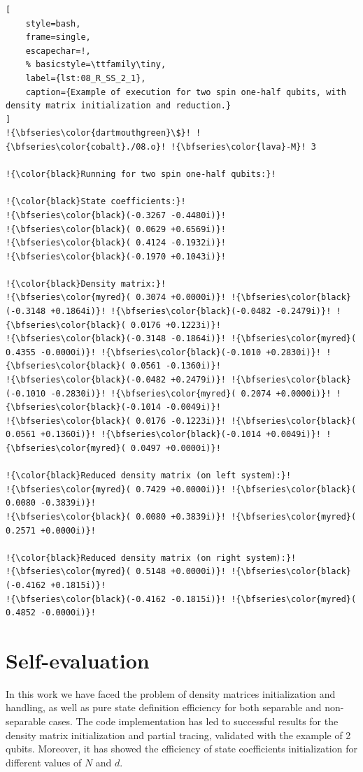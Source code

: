 \documentclass[pra, onecolumn, notitlepage, floats, 11pt]{revtex4-1}
\begin{document}
\medskip
\begin{lstlisting}[
    style=bash,
    frame=single,
    escapechar=!,
    % basicstyle=\ttfamily\tiny,
    label={lst:08_R_SS_2_1},
    caption={Example of execution for two spin one-half qubits, with density matrix initialization and reduction.}
]
!{\bfseries\color{dartmouthgreen}\$}! !{\bfseries\color{cobalt}./08.o}! !{\bfseries\color{lava}-M}! 3

!{\color{black}Running for two spin one-half qubits:}!

!{\color{black}State coefficients:}!
!{\bfseries\color{black}(-0.3267 -0.4480i)}!
!{\bfseries\color{black}( 0.0629 +0.6569i)}!
!{\bfseries\color{black}( 0.4124 -0.1932i)}!
!{\bfseries\color{black}(-0.1970 +0.1043i)}!

!{\color{black}Density matrix:}!
!{\bfseries\color{myred}( 0.3074 +0.0000i)}! !{\bfseries\color{black}(-0.3148 +0.1864i)}! !{\bfseries\color{black}(-0.0482 -0.2479i)}! !{\bfseries\color{black}( 0.0176 +0.1223i)}!
!{\bfseries\color{black}(-0.3148 -0.1864i)}! !{\bfseries\color{myred}( 0.4355 -0.0000i)}! !{\bfseries\color{black}(-0.1010 +0.2830i)}! !{\bfseries\color{black}( 0.0561 -0.1360i)}!
!{\bfseries\color{black}(-0.0482 +0.2479i)}! !{\bfseries\color{black}(-0.1010 -0.2830i)}! !{\bfseries\color{myred}( 0.2074 +0.0000i)}! !{\bfseries\color{black}(-0.1014 -0.0049i)}!
!{\bfseries\color{black}( 0.0176 -0.1223i)}! !{\bfseries\color{black}( 0.0561 +0.1360i)}! !{\bfseries\color{black}(-0.1014 +0.0049i)}! !{\bfseries\color{myred}( 0.0497 +0.0000i)}!

!{\color{black}Reduced density matrix (on left system):}!
!{\bfseries\color{myred}( 0.7429 +0.0000i)}! !{\bfseries\color{black}( 0.0080 -0.3839i)}!
!{\bfseries\color{black}( 0.0080 +0.3839i)}! !{\bfseries\color{myred}( 0.2571 +0.0000i)}!

!{\color{black}Reduced density matrix (on right system):}!
!{\bfseries\color{myred}( 0.5148 +0.0000i)}! !{\bfseries\color{black}(-0.4162 +0.1815i)}!
!{\bfseries\color{black}(-0.4162 -0.1815i)}! !{\bfseries\color{myred}( 0.4852 -0.0000i)}!
\end{lstlisting}


\section{Self-evaluation}
In this work we have faced the problem of density matrices initialization and handling, as well as pure state definition efficiency for both separable and non-separable cases. The code implementation has led to successful results for the density matrix initialization and partial tracing, validated with the example of 2 qubits. Moreover, it has showed the efficiency of state coefficients initialization for different values of \( N \) and \( d \).
\end{document}
